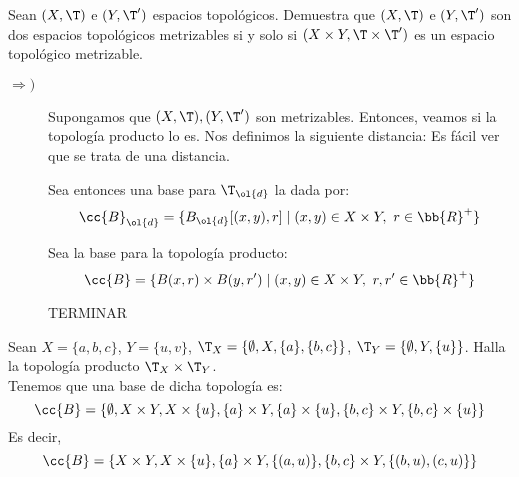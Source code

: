 \begin{ejercicio}
    Sean $(X,\T)$ e $(Y, \T')$ espacios topológicos. Demuestra que $(X,\T)$ e $(Y, \T')$ son dos espacios topológicos metrizables si y solo si $(X \times Y, \T \times \T')$ es un espacio topológico metrizable.

    \begin{description}
        \item[$\Longrightarrow)$] Supongamos que $(X,\T),(Y,\T')$ son metrizables. Entonces, veamos si la topología producto lo es. Nos definimos la siguiente distancia:
        Es fácil ver que se trata de una distancia.

        Sea entonces una base para $\T_{\ol{d}}$ la dada por: $$\cc{B}_{\ol{d}} = \{B_{\ol{d}}[(x,y), r]\mid (x,y)\in X\times Y,~ r\in \bb{R}^+\}$$

        Sea la base para la topología producto:
        \begin{equation*}
            \cc{B} = \{B(x,r)\times B(y,r')\mid (x,y)\in X\times Y,~ r,r'\in \bb{R}^+\}
        \end{equation*}

        TERMINAR

        

        
    \end{description}
\end{ejercicio}

\begin{ejercicio}
    Sean $X = \{a, b, c\}$, $Y = \{u, v\}$, $\T_X = \{\emptyset, X, \{a\}, \{b, c\}\}$, $\T_Y = \{\emptyset, Y, \{u\}\}$. Halla la topología producto $\T_X\times \T_Y$.\\

    Tenemos que una base de dicha topología es:
    \begin{equation*}
        \cc{B}=\{\emptyset, X\times Y, X\times \{u\}, \{a\}\times Y, \{a\}\times \{u\}, \{b,c\}\times Y, \{b,c\}\times \{u\}\}
    \end{equation*}
    Es decir,
    \begin{equation*}
        \cc{B}=\{X\times Y, X\times \{u\}, \{a\}\times Y, \{(a,u)\}, \{b,c\}\times Y, \{(b,u), (c,u)\}\}
    \end{equation*}
\end{ejercicio}

